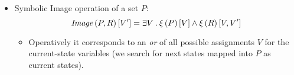 \begin{itemize}
\begin{itemize}
        \end{itemize}

    \item   Symbolic Image operation of a set $P$:
        \[
        \mbox{\emph{Image}}\left({P,R}\right)[V'] = \exists V \:.\: \xi\left({P}\right)[V] \wedge
                          \xi\left({R}\right)[V, V^\prime]
        \]
        \begin{itemize}

        \item   Operatively it corresponds to an \emph{or} of all possible
                assignments $V$ for the current-state variables (we search
                for next states mapped into $P$ as current states).

        \end{itemize}

    \end{itemize}
